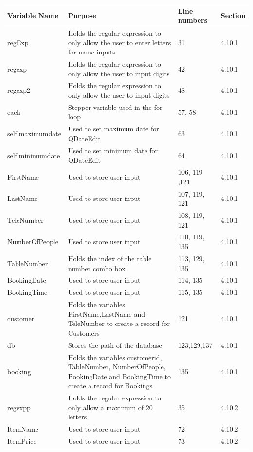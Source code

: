 \begin{center}
\begin{longtable}{|p{3cm}|p{4.5cm}|p{3cm}|p{1cm}|}
\hline
\textbf{Variable Name} & \textbf{Purpose} & \textbf{Line numbers} & \textbf{Section} \\ \hline
regExp & Holds the regular expression to only allow the user to enter letters for name inputs & 31 & 4.10.1\\ \hline
regexp & Holds the regular expression to only allow the user to input digits & 42 &4.10.1 \\ \hline
regexp2 & Holds the regular expression to only allow the user to input digits & 48 &4.10.1 \\ \hline
each & Stepper variable used in the for loop &57, 58 &4.10.1 \\ \hline
self.maximumdate&Used to set maximum date for QDateEdit &63 &4.10.1 \\ \hline
self.minimumdate&Used to set minimum date for QDateEdit &64 &4.10.1 \\ \hline
FirstName&Used to store user input &106, 119 ,121 &4.10.1 \\ \hline
LastName & Used to store user input & 107, 119, 121 &4.10.1 \\ \hline
TeleNumber&Used to store user input  &108, 119, 121 & 4.10.1\\ \hline
NumberOfPeople&Used to store user input &110, 119, 135 & 4.10.1\\ \hline
TableNumber&Holds the index of the table number combo box &113, 129, 135 &4.10.1 \\ \hline
BookingDate & Used to store user input & 114, 135 & 4.10.1\\ \hline
BookingTime&Used to store user input &115, 135 & 4.10.1\\ \hline
customer&Holds the variables FirstName,LastName and TeleNumber to create a record for Customers &121 & 4.10.1\\ \hline
db&Stores the path of the database &123,129,137 & 4.10.1\\ \hline
booking& Holds the variables customerid, TableNumber, NumberOfPeople, BookingDate and BookingTime to create a record for Bookings& 135 &4.10.1 \\ \hline
regexpp& Holds the regular expression to only allow a maximum of 20 letters & 35 &4.10.2 \\ \hline
ItemName & Used to store user input & 72 &4.10.2 \\ \hline
ItemPrice & Used to store user input & 73 &4.10.2 \\ \hline

\end{longtable}
\end{center}
